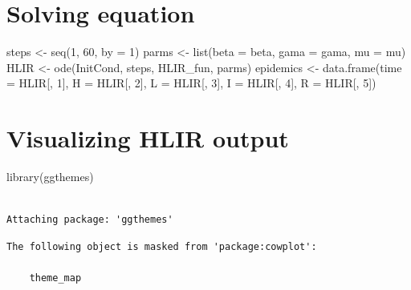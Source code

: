 \documentclass[
  letterpaper,
  DIV=11,
  numbers=noendperiod]{scrreprt}
\newenvironment{Shaded}{\begin{snugshade}}{\end{snugshade}}
\newcommand{\AttributeTok}[1]{\textcolor[rgb]{0.40,0.45,0.13}{#1}}
\newcommand{\DecValTok}[1]{\textcolor[rgb]{0.68,0.00,0.00}{#1}}
\newcommand{\FunctionTok}[1]{\textcolor[rgb]{0.28,0.35,0.67}{#1}}
\newcommand{\NormalTok}[1]{\textcolor[rgb]{0.00,0.23,0.31}{#1}}
\newcommand{\OtherTok}[1]{\textcolor[rgb]{0.00,0.23,0.31}{#1}}
\begin{document}
\hypertarget{solving-equation}{%
\section{Solving equation}\label{solving-equation}}

\begin{Shaded}
\begin{Highlighting}[]
\NormalTok{steps }\OtherTok{\textless{}{-}} \FunctionTok{seq}\NormalTok{(}\DecValTok{1}\NormalTok{, }\DecValTok{60}\NormalTok{, }\AttributeTok{by =} \DecValTok{1}\NormalTok{)}
\NormalTok{parms }\OtherTok{\textless{}{-}} \FunctionTok{list}\NormalTok{(}\AttributeTok{beta =}\NormalTok{ beta, }\AttributeTok{gama =}\NormalTok{ gama, }\AttributeTok{mu =}\NormalTok{ mu)}
\NormalTok{HLIR }\OtherTok{\textless{}{-}} \FunctionTok{ode}\NormalTok{(InitCond, steps, HLIR\_fun, parms)}
\NormalTok{epidemics }\OtherTok{\textless{}{-}} \FunctionTok{data.frame}\NormalTok{(}\AttributeTok{time =}\NormalTok{ HLIR[, }\DecValTok{1}\NormalTok{], }\AttributeTok{H =}\NormalTok{ HLIR[, }\DecValTok{2}\NormalTok{], }\AttributeTok{L =}\NormalTok{ HLIR[, }\DecValTok{3}\NormalTok{], }\AttributeTok{I =}\NormalTok{ HLIR[, }\DecValTok{4}\NormalTok{], }\AttributeTok{R =}\NormalTok{ HLIR[, }\DecValTok{5}\NormalTok{])}
\end{Highlighting}
\end{Shaded}

\hypertarget{visualizing-hlir-output}{%
\section{Visualizing HLIR output}\label{visualizing-hlir-output}}

\begin{Shaded}
\begin{Highlighting}[]
\FunctionTok{library}\NormalTok{(ggthemes)}
\end{Highlighting}
\end{Shaded}

\begin{verbatim}

Attaching package: 'ggthemes'
\end{verbatim}

\begin{verbatim}
The following object is masked from 'package:cowplot':

    theme_map
\end{verbatim}
\end{document}
